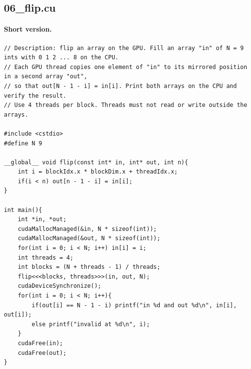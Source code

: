 \documentclass[main.tex]{subfiles}
\begin{document}
\subsection{06\_flip.cu}
\paragraph{Short version.}
\begin{lstlisting}[language=CUDA]
// Description: flip an array on the GPU. Fill an array "in" of N = 9 ints with 0 1 2 ... 8 on the CPU.
// Each GPU thread copies one element of "in" to its mirrored position in a second array "out",
// so that out[N - 1 - i] = in[i]. Print both arrays on the CPU and verify the result.
// Use 4 threads per block. Threads must not read or write outside the arrays.

#include <cstdio>
#define N 9

__global__ void flip(const int* in, int* out, int n){
    int i = blockIdx.x * blockDim.x + threadIdx.x;
    if(i < n) out[n - 1 - i] = in[i];
}

int main(){
    int *in, *out;
    cudaMallocManaged(&in, N * sizeof(int));
    cudaMallocManaged(&out, N * sizeof(int));
    for(int i = 0; i < N; i++) in[i] = i;
    int threads = 4;
    int blocks = (N + threads - 1) / threads;
    flip<<<blocks, threads>>>(in, out, N);
    cudaDeviceSynchronize();
    for(int i = 0; i < N; i++){
        if(out[i] == N - 1 - i) printf("in %d and out %d\n", in[i], out[i]);
        else printf("invalid at %d\n", i);
    }
    cudaFree(in);
    cudaFree(out);
}
\end{lstlisting}
\end{document}
